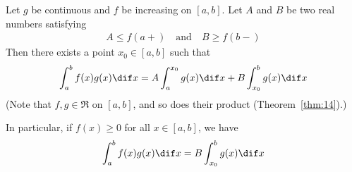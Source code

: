 \documentclass[thmcnt=section, color=blue, 12pt]{my-elegantbook}
\begin{document}
\begin{theorem}
	Let $g$ be continuous and $f$ be increasing on $[a, b]$.
	Let $A$ and $B$ be two real numbers satisfying
	\begin{align*}
		A \leq f(a+)
		\quad \text{and} \quad
		B \geq f(b-)
	\end{align*}
	Then there exists a point $x_0 \in [a, b]$ such that
	\begin{align}
		\int_a^b f(x) g(x) \dif x
		= A \int_a^{x_0} g(x) \dif x
		+ B \int_{x_0}^b g(x) \dif x
		\label{eq:61}
	\end{align}
	(Note that $f, g \in \mathfrak{R}$ on $[a, b]$, and so does their product (Theorem~\ref{thm:14}).)

	In particular, if $f(x) \geq 0$ for all $x \in [a, b]$, we have
	\begin{align}
		\int_a^b f(x) g(x) \dif x
		= B \int_{x_0}^b g(x) \dif x
		\label{eq:62}
	\end{align}
\end{theorem}
\end{document}
